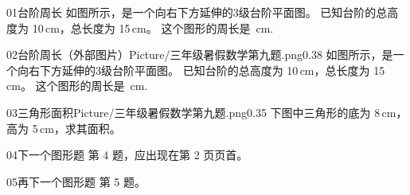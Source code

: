 \documentclass[12pt]{ctexart}
\begin{document}
		\setlength{\parindent}{0pt}
		
		\begin{problem}{01}{台阶周长}
			如图所示，是一个向右下方延伸的3级台阶平面图。
			已知台阶的总高度为 10\,cm，总长度为 15\,cm。
			这个图形的周长是 \underline{\hspace{2cm}}\,cm.
			
			\vspace{1ex}
			\begin{center}
			\end{center}
		\end{problem}
		
		\begin{problemfig}{02}{台阶周长（外部图片）}{Picture/三年级暑假数学第九题.png}{0.38}
			如图所示，是一个向右下方延伸的3级台阶平面图。
			已知台阶的总高度为 10\,cm，总长度为 15\,cm。
			这个图形的周长是 \underline{\hspace{2cm}}\,cm.
		\end{problemfig}
		
		\begin{problemfig}{03}{三角形面积}{Picture/三年级暑假数学第九题.png}{0.35}
			下图中三角形的底为 8\,cm，高为 5\,cm，求其面积。
		\end{problemfig}
		
		\begin{problem}{04}{下一个图形题}
			第 4 题，应出现在第 2 页页首。
		\end{problem}
		
		\begin{problem}{05}{再下一个图形题}
			第 5 题。
		\end{problem}
		
	
\end{document}
